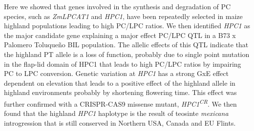 \documentclass[9pt,twocolumn,twoside,lineno]{BioRxiv}
\begin{document}
Here we showed that genes involved in the synthesis and degradation of PC species, such as \textit{ZmLPCAT1} and \textit{HPC1}, have been repeatedly selected in maize highland populations leading to high PC/LPC ratios.   
We then identified \textit{HPC1} as the major candidate gene explaining a major effect PC/LPC QTL in a B73 x Palomero Toluqueño BIL population. 
The allelic effects of this QTL indicate that the highland PT allele is a loss of function, probably due to single point mutation in the flap-lid domain of HPC1 that leads to high PC/LPC ratios by impairing PC to LPC conversion. 
Genetic variation at \textit{HPC1} has a strong GxE effect dependent on elevation that leads to a positive effect of the highland allele in highland environments probably by shortening flowering time.
This effect was further confirmed with a CRISPR-CAS9 missense mutant, \textit{HPC1\textsuperscript{CR}}.
We then found that the highland \textit{HPC1} haplotype is the result of teosinte \textit{mexicana} introgression that is still conserved in Northern USA, Canada and EU Flints. 
\end{document}
